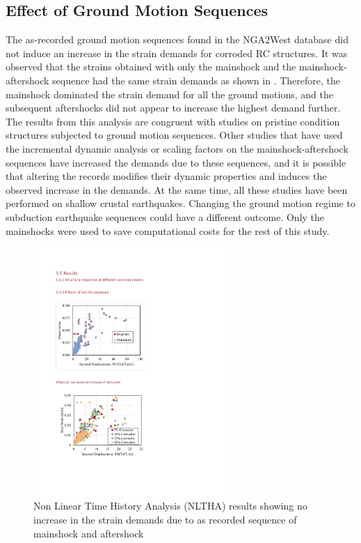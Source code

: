 \subsection{Effect of Ground Motion Sequences}

The as-recorded ground motion sequences found in the NGA2West database \cite{Ancheta2014} did not induce an increase in the strain demands for corroded RC structures. It was observed that the strains obtained with only the mainshock and the mainshock-aftershock sequence had the same strain demands as shown in . Therefore, the mainshock dominated the strain demand for all the ground motions, and the subsequent aftershocks did not appear to increase the highest demand further. The results from this analysis are congruent with studies on pristine condition structures subjected to ground motion sequences\cite{Ruiz-Garcia2011}\cite{Zhai2014}. Other studies that have used the incremental dynamic analysis or scaling factors on the mainshock-aftershock sequences have increased the demands due to these sequences, and it is possible that altering the records modifies their dynamic properties and induces the observed increase in the demands\cite{Raghunandan2015}\cite{Tesfamariam2015}. At the same time, all these studies have been performed on shallow crustal earthquakes. Changing the ground motion regime to subduction earthquake sequences could have a different outcome. Only the mainshocks were used to save computational costs for the rest of this study.

\begin{figure}[htbp]
	\centering
	\includegraphics[width=0.65\textwidth]{VAC Thesis 2.0/Chapter-5/figs/MS_AS_results_noincrease_in_demands.pdf}
	\caption{Non Linear Time History Analysis (NLTHA) results showing no increase in the strain demands due to as recorded sequence of mainshock and aftershock}
	\label{fig:ms_as_results}
\end{figure}

